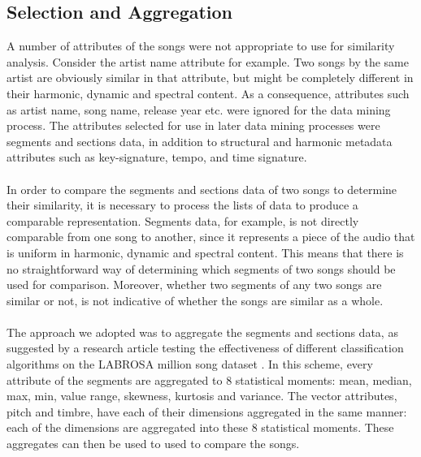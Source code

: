 \subsection{Selection and Aggregation}
\label{sec:preprocessing_selection}
A number of attributes of the songs were not appropriate to use for similarity analysis. Consider the artist name attribute for example. Two songs by the same artist are obviously similar in that attribute, but might be completely different in their harmonic, dynamic and spectral content. As a consequence, attributes such as artist name, song name, release year etc. were ignored for the data mining process. The attributes selected for use in later data mining processes were segments and sections data, in addition to structural and harmonic metadata attributes such as key-signature, tempo, and time signature.
\\\\
In order to compare the segments and sections data of two songs to determine their similarity, it is necessary to process the lists of data to produce a comparable representation. Segments data, for example, is not directly comparable from one song to another, since it represents a piece of the audio that is uniform in harmonic, dynamic and spectral content. This means that there is no straightforward way of determining which segments of two songs should be used for comparison. Moreover, whether two segments of any two songs are similar or not, is not indicative of whether the songs are similar as a whole.
\\\\
The approach we adopted was to aggregate the segments and sections data, as suggested by a research article testing the effectiveness of different classification algorithms on the LABROSA million song dataset \citep{schindler12}. In this scheme, every attribute of the segments are aggregated to 8 statistical moments: mean, median, max, min, value range, skewness, kurtosis and variance. The vector attributes, pitch and timbre, have each of their dimensions aggregated in the same manner: each of the dimensions are aggregated into these 8 statistical moments. These aggregates can then be used to used to compare the songs.


